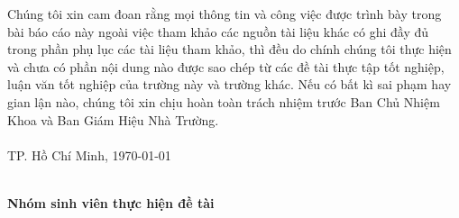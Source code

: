 
Chúng tôi xin cam đoan rằng mọi thông tin và công việc được trình bày trong bài báo cáo này ngoài việc tham khảo các nguồn tài liệu khác có ghi đầy đủ trong phần phụ lục các tài liệu tham khảo, thì đều do chính chúng tôi thực hiện và chưa có phần nội dung nào được sao chép từ các đề tài thực tập tốt nghiệp, luận văn tốt nghiệp của trường này và trường khác. Nếu có bất kì sai phạm hay gian lận nào, chúng tôi xin chịu hoàn toàn trách nhiệm trước Ban Chủ Nhiệm Khoa và Ban Giám Hiệu Nhà Trường.\\\\

TP. Hồ Chí Minh, \today\\\\

{
\setlength{\parskip}{-1cm plus4mm minus3mm}
\begin{tabbing}
	\hspace{8cm} \= \textbf{Nhóm sinh viên thực hiện đề tài}\\	    	
\end{tabbing}
}